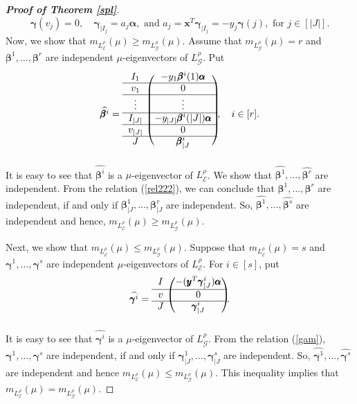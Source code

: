 \documentclass{amsart}
\theoremstyle{remark}
\begin{document}
\begin{proof}[\textbf{Proof of Theorem \ref{spl}}]
\begin{equation}\label{gam}
\pmb{\gamma}(v_{j})=0,\quad \pmb{\gamma}_{| I_{j}}=a_{j}\pmb{\alpha},\text{ and } a_{j}=\pmb{x}^{T}\pmb{\gamma}_{| I_{j}}=-y_{j}\pmb{\gamma}(j),\text{ for } j\in [|J|]. 
\end{equation}
Now, we show that $m_{L_{\mathcal{E}}^{\rho}}(\mu)\geq m_{L_{\mathcal{G}}^{\rho}}(\mu)$.
Assume that $m_{L_{\mathcal{G}}^{\rho}}(\mu)=r$ and $\pmb{\beta}^{1},\ldots,\pmb{\beta}^{r}$ are independent $\mu$-eigenvectors of $L_{\mathcal{G}}^{\rho}$. Put
{\footnotesize \[
\widehat{\pmb{\beta}^{i}}=\begin{blockarray}{cc}
\begin{block}{c(c)}
I_{1} & -y_{1}\pmb{\beta}^{i}(1)\pmb{\alpha} \\ \cline{1-2}
v_{1} & 0\\\cline{1-2}
\vdots&\vdots\\\cline{1-2}
I_{|J|} & -y_{|J|}\pmb{\beta}^{i}(|J|)\pmb{\alpha}  \\ \cline{1-2}
v_{|J|} & 0\\\cline{1-2}
J& \pmb{\beta}^{i}_{|J}\\
\end{block}
\end{blockarray},\quad i\in [r]. 
\]}
It is easy to see that $\widehat{\pmb{\beta}^{i}}$ is a $\mu$-eigenvector of $L_{\mathcal{E}}^{\rho}$. We show that  $\widehat{\pmb{\beta}^{1}},\ldots,\widehat{\pmb{\beta}^{r}}$ are independent.
From the relation (\ref{rel222}), we can conclude that $\pmb{\beta}^{1},\ldots,\pmb{\beta}^{r}$ are independent, if and only if $\pmb{\beta}^{1}_{|J},\ldots,\pmb{\beta}^{r}_{|J}$ are independent. So, $\widehat{\pmb{\beta}^{1}},\ldots,\widehat{\pmb{\beta}^{s}}$ are independent and hence, $m_{L_{\mathcal{E}}^{\rho}}(\mu)\geq m_{L_{\mathcal{G}}^{\rho}}(\mu)$.

Next, we show that $m_{L_{\mathcal{E}}^{\rho}}(\mu)\leq m_{L_{\mathcal{G}}^{\rho}}(\mu)$.
Suppose that $m_{L_{\mathcal{E}}^{\rho}}(\mu)=s$ and $\pmb{\gamma}^{1},\ldots,\pmb{\gamma}^{s}$ are independent $\mu$-eigenvectors of $L_{\mathcal{E}}^{\rho}$.
For $i\in [s]$, put
{\footnotesize \[
\widehat{\pmb{\gamma}^{i}}=\begin{blockarray}{cc}
\begin{block}{c(c)}
I& -(\pmb{y}^{T}\pmb{\gamma}^{i}_{|J})\pmb{\alpha} \\ \cline{1-2}
v& 0\\\cline{1-2}
J& \pmb{\gamma}^{i}_{|J}\\
\end{block}
\end{blockarray}. 
\]}
It is easy to see that $\widehat{\pmb{\gamma}^{i}}$ is a $\mu$-eigenvector of $L_{\mathcal{G}}^{\rho}$.
From the relation (\ref{gam}), $\pmb{\gamma}^{1},\ldots,\pmb{\gamma}^{s}$ are independent, if and only if $\pmb{\gamma}^{1}_{|J},\ldots,\pmb{\gamma}^{s}_{|J}$ are independent. So, $\widehat{\pmb{\gamma}^{1}},\ldots,\widehat{\pmb{\gamma}^{s}}$ are independent and hence $m_{L_{\mathcal{E}}^{\rho}}(\mu)\leq m_{L_{\mathcal{G}}^{\rho}}(\mu)$.
This inequality implies that $m_{L_{\mathcal{E}}^{\rho}}(\mu)=m_{L_{\mathcal{G}}^{\rho}}(\mu)$.
\end{proof}
\end{document}

